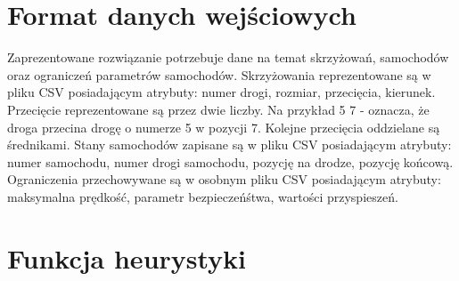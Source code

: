 \section{Format danych wejściowych}

Zaprezentowane rozwiązanie potrzebuje dane na temat skrzyżowań, samochodów oraz ograniczeń parametrów samochodów. Skrzyżowania reprezentowane są w pliku CSV posiadającym atrybuty: numer drogi, rozmiar, przecięcia, kierunek. Przecięcie reprezentowane są przez dwie liczby. Na przykład 5 7 - oznacza, że droga przecina drogę o numerze 5 w pozycji 7. Kolejne przecięcia oddzielane są średnikami. Stany samochodów zapisane są w pliku CSV posiadającym atrybuty: numer samochodu, numer drogi samochodu, pozycję na drodze, pozycję końcową. Ograniczenia przechowywane są w osobnym pliku CSV posiadającym atrybuty: maksymalna prędkość, parametr bezpieczeńśtwa, wartości przyspieszeń.

\section{Funkcja heurystyki}

